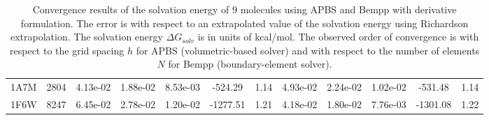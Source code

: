 \documentclass[11pt]{article}
\begin{document}
\begin{landscape}
\begin{table}[]
{\begin{tabular}{cc|ccc|cc|ccc|cc}
    1A7M & 2804 & 4.13e-02 & 1.88e-02 & 8.53e-03 & -524.29                            & 1.14                   & 4.93e-02 & 2.24e-02 & 1.02e-02 & -531.48                            & 1.14                   \\
    1F6W & 8247 & 6.45e-02 & 2.78e-02 & 1.20e-02 & -1277.51                           & 1.21                   & 4.18e-02 & 1.80e-02 & 7.76e-03 & -1301.08                           & 1.22                     
    \end{tabular}
    }
    \caption{Convergence results of the solvation energy of 9 molecules using APBS and Bempp with derivative formulation.
    The error is with respect to an extrapolated value of the solvation energy using Richardson extrapolation.
    The solvation energy $\Delta G_{solv}$ is in units of kcal/mol.
    The observed order of convergence is with respect to the grid spacing $h$ for APBS (volumetric-based solver) and with respect to the number of elements $N$ for Bempp (boundary-element solver).}
    \label{tab:APBS_result}
\end{table}
\end{landscape}

{}

\end{document}
